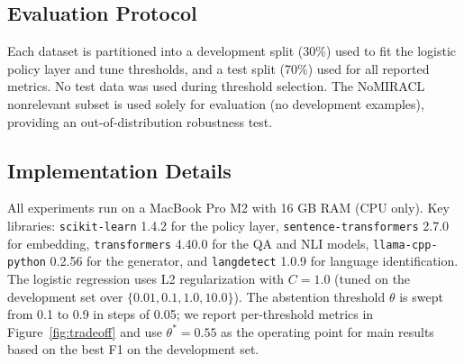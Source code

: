 \subsection{Evaluation Protocol}

Each dataset is partitioned into a development split (30\%) used to fit the logistic policy layer and tune thresholds, and a test split (70\%) used for all reported metrics. No test data was used during threshold selection. The NoMIRACL nonrelevant subset is used solely for evaluation (no development examples), providing an out-of-distribution robustness test.

\subsection{Implementation Details}

All experiments run on a MacBook Pro M2 with 16 GB RAM (CPU only). Key libraries: \texttt{scikit-learn} 1.4.2 for the policy layer, \texttt{sentence-transformers} 2.7.0 for embedding, \texttt{transformers} 4.40.0 for the QA and NLI models, \texttt{llama-cpp-python} 0.2.56 for the generator, and \texttt{langdetect} 1.0.9 for language identification. The logistic regression uses L2 regularization with $C = 1.0$ (tuned on the development set over $\{0.01, 0.1, 1.0, 10.0\}$). The abstention threshold $\theta$ is swept from 0.1 to 0.9 in steps of 0.05; we report per-threshold metrics in Figure~\ref{fig:tradeoff} and use $\theta^* = 0.55$ as the operating point for main results based on the best F1 on the development set.
